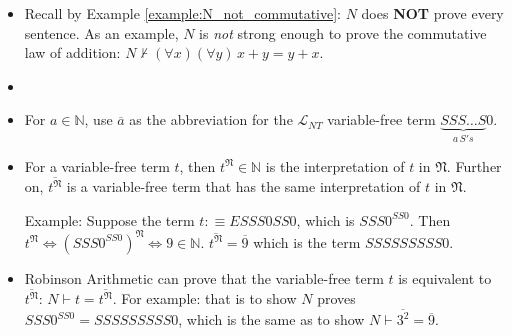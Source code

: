 \documentclass[11pt,letterpaper]{book}
\theoremstyle{definition}
\newtheorem{lemma}{Lemma}[section]
\begin{document}
\begin{itemize}
{%

}

\item{Recall by Example \ref{example:N_not_commutative}: $N$ does \textbf{NOT} prove every sentence. As an example, $N$ is \emph{not} strong enough to prove the commutative law
of addition: $ N \nvdash (\forall x ) (\forall y)\, x + y = y +
x $.}

\end{itemize}

\begin{itemize}
\item[]
\item{For $a \in \mathbb{N} $, use $\overline{a}$ as the abbreviation for the $\mathcal{L}_{NT}$ variable-free term $\underbrace{SSS\ldots S }_{a\, S's} 0$.}
\item{For a variable-free term $t$, then $t^{\mathfrak{N}} \in \mathbb{N} $ is the interpretation of $t$ in $\mathfrak{N}$. Further on, $\overline{t^{\mathfrak{N}}}$ is a variable-free term that has the same interpretation of $t$ in $\mathfrak{N}$.

Example: Suppose the term $t: \equiv E SSS0 SS0 $, which is $ SSS0 ^{SS0}$. Then
$t^{\mathfrak{N}} \iff (SSS0 ^{SS0})^{\mathfrak{N}} \iff 9 \in \mathbb{N} $. $\overline{t^{\mathfrak{N}}} = \overline{9}$ which
is the term $ SSS SSS SSS 0 $.
}
\item{Robinson Arithmetic can prove that the variable-free term $t$ is equivalent to $\overline{t^{\mathfrak{N}}}$: $N \vdash t =
\overline{t^{\mathfrak{N}}}$. For example: that is to show $N$ proves $ SSS0 ^{SS 0}
= SSS SSS SSS 0 $, which is the same as to show $N \vdash
\overline{3^2} = \overline{9} $.}
\end{itemize}
\end{document}
